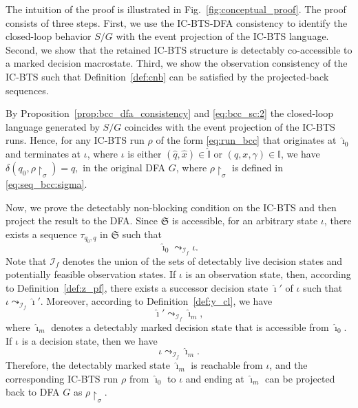 \documentclass[twocolumn]{autart}
\begin{document}
\begin{pf}
The intuition of the proof is illustrated in Fig.~\ref{fig:conceptual_proof}. The proof consists of three steps.
First, we use the IC-BTS-DFA consistency to identify the closed-loop behavior $S/G$ with the event projection of the IC-BTS language.
Second, we show that the retained IC-BTS structure is detectably co-accessible to a marked decision macrostate.
Third, we show the observation consistency of the IC-BTS such that Definition~\ref{def:cnb} can be satisfied by the projected-back sequences.


By Proposition~\ref{prop:bcc_dfa_consistency} and \eqref{eq:bcc_sc:2} the closed-loop language generated by $S / G$ coincides with the event projection of the IC-BTS runs.
Hence, for any IC-BTS run $\rho$ of the form \eqref{eq:run_bcc} that originates at $\hat{\imath}_0$ and terminates at $\iota$, where $\iota$ is either $(\hat{q}, \hat{x}) \in \hat{\mathbb{I}}$ or $(q, x, \gamma) \in \mathbb{I}$, we have
$
    \delta(q_0, \rho\restriction_\sigma) = q,
$
in the original DFA $G$, where $\rho\restriction_\sigma$ is defined in \eqref{eq:seq_bcc:sigma}.


Now, we prove the detectably non-blocking condition on the IC-BTS and then project the result to the DFA.
Since $\mathfrak{S}$ is accessible, for an arbitrary state $\iota$, there exists a sequence $\tau_{q_0, q}$ in $\mathfrak{S}$ such that
$$
\hat{\imath}_0 \leadsto_{\mathcal{I}_f} \iota.
$$
Note that $\mathcal{I}_f$ denotes the union of the sets of detectably live decision states and potentially feasible observation states.
If $\iota$ is an observation state, then, according to Definition~\ref{def:z_pf}, there exists a successor decision state $\hat{\imath}'$ of $\iota$ such that
$
\iota \leadsto_{\mathcal{I}_f} \hat{\imath}'.
$
Moreover, according to Definition~\ref{def:y_cl}, we have
$$
\hat{\imath}' \leadsto_{\mathcal{I}_f} \hat{\imath}_m,
$$
where $\hat{\imath}_m$ denotes a detectably marked decision state that is accessible from $\hat{\imath}_0$.
If $\iota$ is a decision state, then we have
$$
\iota \leadsto_{\mathcal{I}_f} \hat{\imath}_m.
$$
Therefore, the detectably marked state $\hat{\imath}_m$ is reachable from $\iota$, and
the corresponding IC-BTS run $\rho$ from $\hat{\imath}_0$ to $\iota$ and ending at $\hat{\imath}_m$ can be projected back to DFA $G$ as $\rho\restriction_{\sigma}$.


\end{pf}
\end{document}
